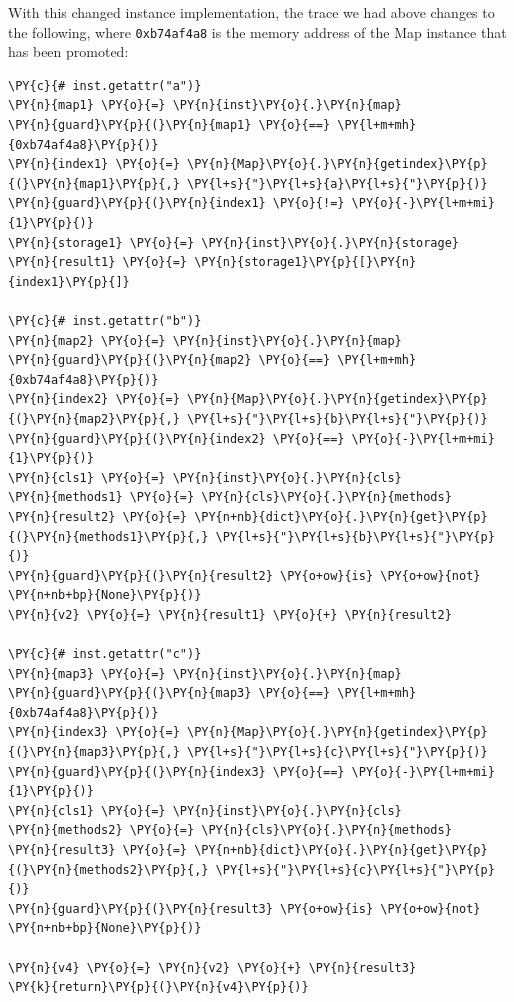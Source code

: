 \documentclass{sig-alternate}
\begin{document}
With this changed instance implementation, the trace we had above changes to the
following, where \texttt{0xb74af4a8} is the memory address of the Map instance that
has been promoted:
\begin{Verbatim}[commandchars=\\\{\}]
\PY{c}{# inst.getattr("a")}
\PY{n}{map1} \PY{o}{=} \PY{n}{inst}\PY{o}{.}\PY{n}{map}
\PY{n}{guard}\PY{p}{(}\PY{n}{map1} \PY{o}{==} \PY{l+m+mh}{0xb74af4a8}\PY{p}{)}
\PY{n}{index1} \PY{o}{=} \PY{n}{Map}\PY{o}{.}\PY{n}{getindex}\PY{p}{(}\PY{n}{map1}\PY{p}{,} \PY{l+s}{"}\PY{l+s}{a}\PY{l+s}{"}\PY{p}{)}
\PY{n}{guard}\PY{p}{(}\PY{n}{index1} \PY{o}{!=} \PY{o}{-}\PY{l+m+mi}{1}\PY{p}{)}
\PY{n}{storage1} \PY{o}{=} \PY{n}{inst}\PY{o}{.}\PY{n}{storage}
\PY{n}{result1} \PY{o}{=} \PY{n}{storage1}\PY{p}{[}\PY{n}{index1}\PY{p}{]}

\PY{c}{# inst.getattr("b")}
\PY{n}{map2} \PY{o}{=} \PY{n}{inst}\PY{o}{.}\PY{n}{map}
\PY{n}{guard}\PY{p}{(}\PY{n}{map2} \PY{o}{==} \PY{l+m+mh}{0xb74af4a8}\PY{p}{)}
\PY{n}{index2} \PY{o}{=} \PY{n}{Map}\PY{o}{.}\PY{n}{getindex}\PY{p}{(}\PY{n}{map2}\PY{p}{,} \PY{l+s}{"}\PY{l+s}{b}\PY{l+s}{"}\PY{p}{)}
\PY{n}{guard}\PY{p}{(}\PY{n}{index2} \PY{o}{==} \PY{o}{-}\PY{l+m+mi}{1}\PY{p}{)}
\PY{n}{cls1} \PY{o}{=} \PY{n}{inst}\PY{o}{.}\PY{n}{cls}
\PY{n}{methods1} \PY{o}{=} \PY{n}{cls}\PY{o}{.}\PY{n}{methods}
\PY{n}{result2} \PY{o}{=} \PY{n+nb}{dict}\PY{o}{.}\PY{n}{get}\PY{p}{(}\PY{n}{methods1}\PY{p}{,} \PY{l+s}{"}\PY{l+s}{b}\PY{l+s}{"}\PY{p}{)}
\PY{n}{guard}\PY{p}{(}\PY{n}{result2} \PY{o+ow}{is} \PY{o+ow}{not} \PY{n+nb+bp}{None}\PY{p}{)}
\PY{n}{v2} \PY{o}{=} \PY{n}{result1} \PY{o}{+} \PY{n}{result2}

\PY{c}{# inst.getattr("c")}
\PY{n}{map3} \PY{o}{=} \PY{n}{inst}\PY{o}{.}\PY{n}{map}
\PY{n}{guard}\PY{p}{(}\PY{n}{map3} \PY{o}{==} \PY{l+m+mh}{0xb74af4a8}\PY{p}{)}
\PY{n}{index3} \PY{o}{=} \PY{n}{Map}\PY{o}{.}\PY{n}{getindex}\PY{p}{(}\PY{n}{map3}\PY{p}{,} \PY{l+s}{"}\PY{l+s}{c}\PY{l+s}{"}\PY{p}{)}
\PY{n}{guard}\PY{p}{(}\PY{n}{index3} \PY{o}{==} \PY{o}{-}\PY{l+m+mi}{1}\PY{p}{)}
\PY{n}{cls1} \PY{o}{=} \PY{n}{inst}\PY{o}{.}\PY{n}{cls}
\PY{n}{methods2} \PY{o}{=} \PY{n}{cls}\PY{o}{.}\PY{n}{methods}
\PY{n}{result3} \PY{o}{=} \PY{n+nb}{dict}\PY{o}{.}\PY{n}{get}\PY{p}{(}\PY{n}{methods2}\PY{p}{,} \PY{l+s}{"}\PY{l+s}{c}\PY{l+s}{"}\PY{p}{)}
\PY{n}{guard}\PY{p}{(}\PY{n}{result3} \PY{o+ow}{is} \PY{o+ow}{not} \PY{n+nb+bp}{None}\PY{p}{)}

\PY{n}{v4} \PY{o}{=} \PY{n}{v2} \PY{o}{+} \PY{n}{result3}
\PY{k}{return}\PY{p}{(}\PY{n}{v4}\PY{p}{)}
\end{Verbatim}
\end{document}
